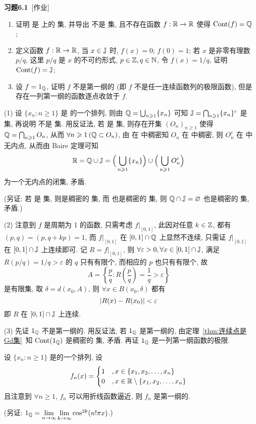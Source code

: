 	\textbf{习题6.1}\ [作业]
	\begin{enumerate}[(1)]
		\item 证明 \J 是 \R 上的 \Gd 集, 并导出 \Q 不是 \Gd 集, 且不存在函数 $ f:\mathbb{R}\to\mathbb{R} $ 使得 $ \operatorname{Cont}(f)=\mathbb{Q} $;
		\item 定义函数 $ f:\mathbb{R}\to\mathbb{R} $, 当 $ x\in\mathbb{J} $ 时, $ f(x)=0 $; $ f(0)=1 $; 若 $ x $ 是非零有理数 $ p/q $, 这里 $ p/q $ 是 $ x $ 的不可约形式, $ p\in\mathbb{Z}, q\in\mathbb{N} $, 令 $ f(x)=1/q $, 证明 $ \operatorname{Cont}(f)=\mathbb{J} $;
		\item 设 $ f=1_{\mathbb{Q}} $, 证明 $ f $ 不是第一纲的 (即 $ f $ 不是任一连续函数列的极限函数), 但是存在一列第一纲的函数逐点收敛于 $ f $.
	\end{enumerate}
	\begin{Proof}
		(1) 设 $ \{ x_{n}:n\geqslant1\} $ 是 \Q 的一个排列, 则由 $ \mathbb{Q}=\bigcup_{n\geqslant1}\{ x_{n} \} $ 可知 $ \mathbb{J} =\bigcap_{n\geqslant1}\{ x_{n} \}^{c} $ 是 \Gd 集, 再说明 \Q 不是 \Gd 集. 用反证法, 若 \Q 是 \Gd 集, 则存在开集 $ (O_{n})_{n\geqslant1} $ 使得 $ \mathbb{Q} = \bigcap_{n\geqslant1}O_{n} $, 从而 $ \forall n\geqslant1\,(\mathbb{Q}\subset O_{n}) $, 由 \Q 在 \R 中稠密知 $ O_{n} $ 在 \R 中稠密, 则 $ O_{n}^{c} $ 在 \R 中无内点, 从而由 Baire 定理可知
		\[
			\mathbb{R} = \mathbb{Q}\cup\mathbb{J} = \Big( \bigcup_{n\geqslant1}\{ x_{n} \} \Big)\cup\Big( \bigcup_{n\geqslant1}O_{n}^{c} \Big)
		\]
		为一个无内点的闭集, 矛盾. 

		(另证: 若 \Q 是 \Gd 集, 则\Q 是稠密的 \Gd 集, 而 \J 也是稠密的 \Gd 集, 则 $ \mathbb{Q}\cap\mathbb{J}=\varnothing $ 也是稠密的 \Gd 集, 矛盾.)

		(2) 注意到 $ f $ 是周期为 1 的函数, 只需考虑 $ f|_{[0, 1]} $, 此因对任意 $ k\in\mathbb{Z} $, 都有 $ (p, q)=(p, q+kp)=1 $, 而 $ f|_{[0, 1]} $ 在 $ [0, 1]\cap\mathbb{Q} $ 上显然不连续, 只需证 $ f|_{[0, 1]} $ 在 $ [0, 1]\cap\mathbb{J} $ 上连续即可. 记 $ R = f|_{[0, 1]} $, 则 $ \forall \varepsilon>0, \forall x\in[0, 1]\cap\mathbb{J} $, 满足 $ R(p/q)=1/q>\varepsilon $ 的 $ q $ 只有有限个, 而相应的 $ p $ 也只有有限个, 故
		\[
			A=\left\{ \frac{p}{q}:R\left( \frac{p}{q} \right)=\frac{1}{q}>\varepsilon \right\}
		\]
		是有限集, 取 $ \delta = d(x_{0}, A) $, 则 $ \forall x\in B(x_{0}, \delta) $ 都有
		\[
			\left| R(x)-R(x_{0}) \right| <\varepsilon
		\]
		即 $ R $ 在 $ [0, 1]\cap\mathbb{J} $ 上连续.

		(3) 先证 $ 1_{\mathbb{Q}} $ 不是第一纲的. 用反证法, 若 $ 1_{\mathbb{Q}} $ 是第一纲的, 由定理~\ref{thm:连续点是Gd集}~知 $ \operatorname{Cont}(1_{\mathbb{Q}}) $ 是稠密的 \Gd 集, 矛盾. 再证 $ 1_{\mathbb{Q}} $ 是一列第一纲函数的极限.

		设 $ \{ x_{n}:n\geqslant1\} $ 是\Q 的一个排列, 设
		\[
			f_{n}(x)=\begin{cases}
				1 & , x\in\{ x_{1}, x_{2}, \dots, x_{n} \}\\
				0 & , x\in\mathbb{R}\setminus\{ x_{1}, x_{2}, \dots, x_{n} \}
			\end{cases}
		\]
		且注意到 $ \forall n\geqslant1 $, $ f_{n} $ 可以用折线函数逼近, 则 $ f_{n} $ 是第一纲的.

		(另证: $ 1_{\mathbb{Q}}=\lim\limits_{n\to \infty}\lim\limits_{k\to\infty}\cos^{2k}(n!\pi x) $.)
	\end{Proof}

